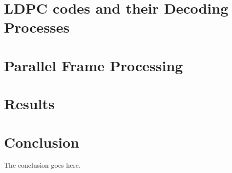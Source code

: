 \documentclass[conference]{IEEEtran}
\begin{document}
\section{LDPC codes and their Decoding Processes}

\section{Parallel Frame Processing}

\section{Results}

\section{Conclusion}
The conclusion goes here.

\newpage






\end{document}
